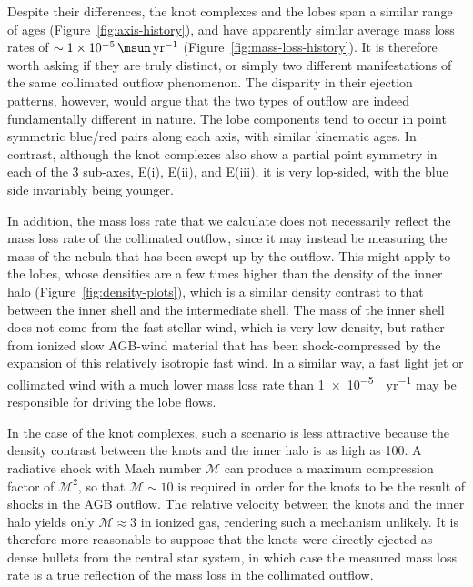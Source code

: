 \documentclass[useAMS, usenatbib]{mnras}
\begin{document}
Despite their differences,
the knot complexes and the lobes span a similar range of ages
(Figure~\ref{fig:axis-history}),
and have apparently similar average mass loss rates of \(\sim \SI{1e-5}{\msun.yr^{-1}}\) 
(Figure~\ref{fig:mass-loss-history}).
It is therefore worth asking if they are truly distinct,
or simply two different manifestations of the same collimated outflow phenomenon.
The disparity in their ejection patterns, however,
would argue that the two types of outflow are indeed fundamentally different in nature.
The lobe components tend to occur in point symmetric blue/red pairs along each axis,
with similar kinematic ages.
In contrast,
although the knot complexes also show a partial point symmetry in each of the 3 sub-axes,
E(i), E(ii), and E(iii),
it is very lop-sided, with the blue side invariably being younger.

In addition, the mass loss rate that we calculate does not necessarily reflect the mass loss rate of the collimated outflow,
since it may instead be measuring the mass of the nebula that has been swept up by the outflow.
This might apply to the lobes, whose densities are a few times higher than the density of the inner halo (Figure~\ref{fig:density-plots}),
which is a similar density contrast to that between the inner shell and the intermediate shell.
The mass of the inner shell does not come from the fast stellar wind,
which is very low density,
but rather from ionized slow AGB-wind material that has been shock-compressed by the expansion of this relatively isotropic fast wind.
In a similar way, a fast light jet or collimated wind with a much lower mass loss rate than \SI{1e-5}{\msun.yr^{-1}} may be responsible for driving the lobe flows.

In the case of the knot complexes,
such a scenario is less attractive
because the density contrast between the knots and the inner halo is as high as 100.
A radiative shock with Mach number \(\mathcal{M}\) can produce a maximum compression factor of \(\mathcal{M}^2\),
so that \(\mathcal{M} \sim 10\) is required in order for the knots to be the result of shocks in the AGB outflow.
The relative velocity between the knots and the inner halo yields only \(\mathcal{M} \approx 3\)
in ionized gas,
rendering such a mechanism unlikely.
It is therefore more reasonable to suppose that the knots were directly ejected as dense bullets from the central star system,
in which case the measured mass loss rate is a true reflection of the mass loss in the collimated outflow.
\end{document}
